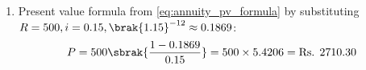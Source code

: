 \begin{enumerate}[label=\thesubsection.\arabic*, ref=\thesubsection.\theenumi]
\begin{enumerate}[label=\brak{\alph*}]
\begin{figure}[H]
			The following code stimulates the result.
			\noindent{}
		\end{figure}
		\item Present value formula from \eqref{eq:annuity_pv_formula} by substituting $R = 500, i = 0.15, \brak{1.15}^{-12} \approx 0.1869$:
		\begin{align}
			P = 500 \sbrak{\frac{1 - 0.1869}{0.15}} = 500 \times 5.4206 = \text{Rs. } 2710.30
		\end{align}
		\begin{figure}[H]
			\centering
			\noindent{}
		\end{figure}
	\end{enumerate}
	

\end{enumerate}
